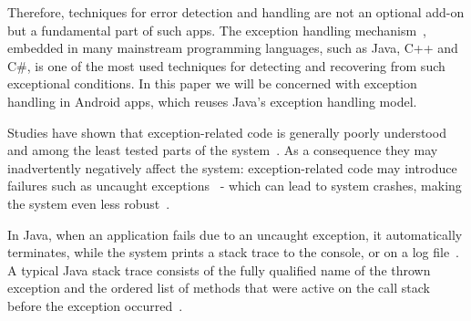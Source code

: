 \documentclass[conference]{IEEEtran}
\begin{document}
Therefore, techniques for error detection and handling are not  an optional add-on but a 
fundamental part of such apps. The exception handling mechanism~\cite{goodenough1975exception},
embedded in many mainstream programming languages, such as Java, C++ and C\#,
 is one of the most used techniques for detecting and recovering from such exceptional conditions.
In this paper we will be concerned with exception handling in Android apps,
which reuses Java's exception handling model.
 

Studies have shown that exception-related code is generally poorly understood and among the least tested parts of the system~\cite{miller1997issues,Robil00,shah2010understanding, 
garcia2007extracting,garcia2001comparative,cabral2007exception,coelho2011unveiling,yuan:2014.osdi}.
As a consequence they may inadvertently negatively affect the system: exception-related code may introduce failures such as 
uncaught exceptions~\cite{jo2004uncaught, Zhang12} - 
which can lead to system crashes, making the system even less robust~\cite{coelho2011unveiling}.

In Java, when an application fails due to an uncaught exception, 
it automatically terminates, while the system prints a stack trace to the console, 
or on a log file~\cite{gosling2000java}.  A typical Java stack trace consists of  the fully qualified name 
of the thrown exception and the ordered list of methods that were active on the call stack before 
the exception occurred~\cite{gosling2000java,bloch2008effective}.

\end{document}
